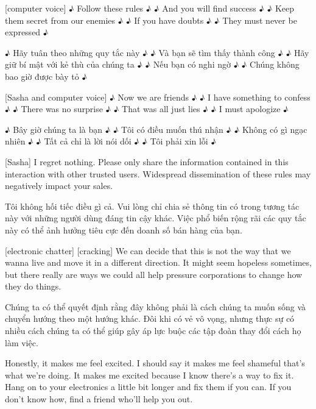 \documentclass[a4paper]{article}
\begin{document}
	
	[computer voice] ♪ Follow these rules ♪
	♪ And you will find success ♪
	♪ Keep them secret from our enemies ♪
	♪ If you have doubts ♪
	♪ They must never be expressed ♪
	
	\begin{vietnamese-v2}
		 ♪ Hãy tuân theo những quy tắc này ♪
		♪ Và bạn sẽ tìm thấy thành công ♪
		♪ Hãy giữ bí mật với kẻ thù của chúng ta ♪
		♪ Nếu bạn có nghi ngờ ♪
		♪ Chúng không bao giờ được bày tỏ ♪
	\end{vietnamese-v2}
	
	[Sasha and computer voice] ♪ Now we are friends ♪
	♪ I have something to confess ♪
	♪ There was no surprise ♪
	♪ That was all just lies ♪
	♪ I must apologize ♪
	
	\begin{vietnamese-v2}
		 ♪ Bây giờ chúng ta là bạn ♪
		♪ Tôi có điều muốn thú nhận ♪
		♪ Không có gì ngạc nhiên ♪
		♪ Tất cả chỉ là lời nói dối ♪
		♪ Tôi phải xin lỗi ♪
	\end{vietnamese-v2}
	
	[Sasha] I regret nothing.
	Please only share the information contained in this interaction with other trusted users.
	Widespread dissemination of these rules may negatively impact your sales.
	
	\begin{vietnamese-v2}
		[Sasha] Tôi không hối tiếc điều gì cả.
		Vui lòng chỉ chia sẻ thông tin có trong tương tác này với những người dùng đáng tin cậy khác.
		Việc phổ biến rộng rãi các quy tắc này có thể ảnh hưởng tiêu cực đến doanh số bán hàng của bạn.
	\end{vietnamese-v2}
	
	[electronic chatter]
	[cracking]
	We can decide that this is not the way that we wanna live and move it in a different direction.
	It might seem hopeless sometimes, but there really are ways we could all help pressure corporations to change how they do things.
	
	\begin{vietnamese-v2}
		Chúng ta có thể quyết định rằng đây không phải là cách chúng ta muốn sống và chuyển hướng theo một hướng khác.
		Đôi khi có vẻ vô vọng, nhưng thực sự có nhiều cách chúng ta có thể giúp gây áp lực buộc các tập đoàn thay đổi cách họ làm việc.
	\end{vietnamese-v2}
	
	Honestly, it makes me feel excited.
	I should say it makes me feel shameful that's what we're doing.
	It makes me excited because I know there's a way to fix it.
	Hang on to your electronics a little bit longer and fix them if you can.
	If you don't know how, find a friend who'll help you out.
	
\end{document}
